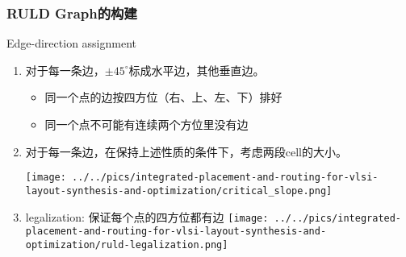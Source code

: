 \documentclass[UTF8,lualatex]{ctexbeamer}
\begin{document}

\begin{frame}
    \frametitle{RULD Graph的构建}
    
    \begin{block}{Edge-direction assignment}
        \begin{enumerate}
            \item 对于每一条边，$\pm 45^\circ$标成水平边，其他垂直边。
                \begin{itemize}
                    \item 同一个点的边按四方位（右、上、左、下）排好
                    \item 同一个点不可能有连续两个方位里没有边
                \end{itemize}
            \item 对于每一条边，在保持上述性质的条件下，考虑两段cell的大小。
                \begin{center}
                    \texttt{[image: ../../pics/integrated-placement-and-routing-for-vlsi-layout-synthesis-and-optimization/critical\_slope.png]}
                \end{center}
            \item legalization: 保证每个点的四方位都有边
                \quad\texttt{[image: ../../pics/integrated-placement-and-routing-for-vlsi-layout-synthesis-and-optimization/ruld-legalization.png]}
        \end{enumerate}
    \end{block}
\end{frame}

\end{document}
